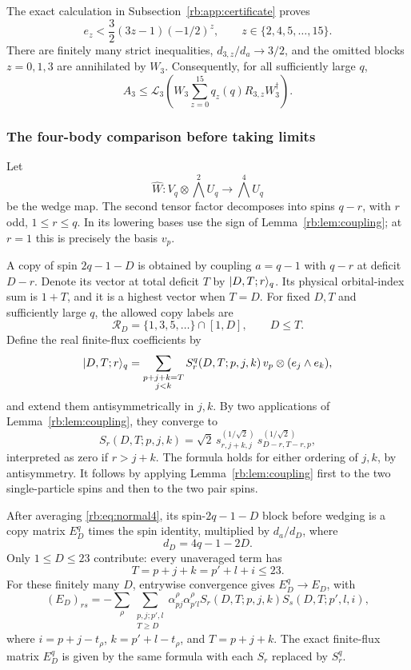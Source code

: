 The exact calculation in Subsection~\ref{rb:app:certificate} proves
\begin{equation}\label{rb:eq:3certificate}
 e_z<\frac32(3z-1)(-1/2)^z,
 \qquad z\in\{2,4,5,\ldots,15\}.
\end{equation}
There are finitely many strict inequalities, $d_{3,z}/d_a\to3/2$, and the omitted blocks $z=0,1,3$ are annihilated by $W_3$. Consequently, for all sufficiently large $q$,
\begin{equation}\label{rb:eq:A3bound}
 A_3\le\mathcal L_3\left(W_3\sum_{z=0}^{15}q_z(q)R_{3,z}W_3^\dagger\right).
\end{equation}

\subsubsection{The four-body comparison before taking limits}
Let
\[
 \widehat W:V_q\otimes\bigwedge^2U_q\longrightarrow\bigwedge^4U_q
\]
be the wedge map. The second tensor factor decomposes into spins $q-r$, with $r$ odd, $1\le r\le q$. In its lowering bases use the sign of Lemma~\ref{rb:lem:coupling}; at $r=1$ this is precisely the basis $v_p$.

A copy of spin $2q-1-D$ is obtained by coupling $a=q-1$ with $q-r$ at deficit $D-r$. Denote its vector at total deficit $T$ by $\lvert D,T;r\rangle_q$. Its physical orbital-index sum is $1+T$, and it is a highest vector when $T=D$. For fixed $D,T$ and sufficiently large $q$, the allowed copy labels are
\[
 \mathcal R_D=\{1,3,5,\ldots\}\cap[1,D],\qquad D\le T.
\]
Define the real finite-flux coefficients by
\[
 \lvert D,T;r\rangle_q=\sum_{\substack{p+j+k=T\\j<k}}
 S_r^q(D,T;p,j,k)\,v_p\otimes(e_j\wedge e_k),
\]
and extend them antisymmetrically in $j,k$. By two applications of Lemma~\ref{rb:lem:coupling}, they converge to
\begin{equation}\label{rb:eq:S}
 S_r(D,T;p,j,k)=\sqrt2\,
 s^{(1/\sqrt2)}_{r,j+k,j}\,
 s^{(1/\sqrt2)}_{D-r,T-r,p},
\end{equation}
interpreted as zero if $r>j+k$. The formula holds for either ordering of $j,k$, by antisymmetry. It follows by applying Lemma~\ref{rb:lem:coupling} first to the two single-particle spins and then to the two pair spins.

After averaging \eqref{rb:eq:normal4}, its spin-$2q-1-D$ block before wedging is a copy matrix $E_D^q$ times the spin identity, multiplied by $d_a/d_D$, where
\[
 d_D=4q-1-2D.
\]
Only $1\le D\le23$ contribute: every unaveraged term has
\[
 T=p+j+k=p'+l+i\le23.
\]
For these finitely many $D$, entrywise convergence gives $E_D^q\to E_D$, with
\begin{equation}\label{rb:eq:E}
 (E_D)_{rs}=-\sum_\rho\sum_{\substack{p,j;p',l\\T\ge D}}
 \alpha^{\rho}_{pj}\alpha^{\rho}_{p'l}
 S_r(D,T;p,j,k)S_s(D,T;p',l,i),
\end{equation}
where $i=p+j-t_\rho$, $k=p'+l-t_\rho$, and $T=p+j+k$. The exact finite-flux matrix $E_D^q$ is given by the same formula with each $S_r$ replaced by $S_r^q$.

